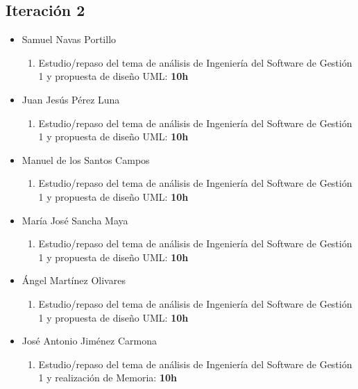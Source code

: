 \documentclass[11 pt]{book}
\begin{document}
		\subsection*{Iteración 2}
		    \begin{itemize}
			    \item Samuel Navas Portillo
				    \begin{enumerate}
					    \item Estudio/repaso del tema de análisis de Ingeniería del Software de Gestión 1 y propuesta de diseño UML: \textbf{10h}
				    \end{enumerate}
			    \item Juan Jesús Pérez Luna
				    \begin{enumerate}
					    \item Estudio/repaso del tema de análisis de Ingeniería del Software de Gestión 1 y propuesta de diseño UML: \textbf{10h}
				    \end{enumerate}
			    \item Manuel de los Santos Campos
				    \begin{enumerate}
					    \item Estudio/repaso del tema de análisis de Ingeniería del Software de Gestión 1 y propuesta de diseño UML: \textbf{10h}
				    \end{enumerate}
			    \item María José Sancha Maya
				    \begin{enumerate}
					    \item Estudio/repaso del tema de análisis de Ingeniería del Software de Gestión 1 y propuesta de diseño UML: \textbf{10h}
				    \end{enumerate}
			    \item Ángel Martínez Olivares
				    \begin{enumerate}
					    \item Estudio/repaso del tema de análisis de Ingeniería del Software de Gestión 1 y propuesta de diseño UML: \textbf{10h}
				    \end{enumerate}
			    \item José Antonio Jiménez Carmona
				    \begin{enumerate}
					    \item Estudio/repaso del tema de análisis de Ingeniería del Software de Gestión 1 y realización de Memoria: \textbf{10h}
				    \end{enumerate}
		    \end{itemize}
		
\end{document}
